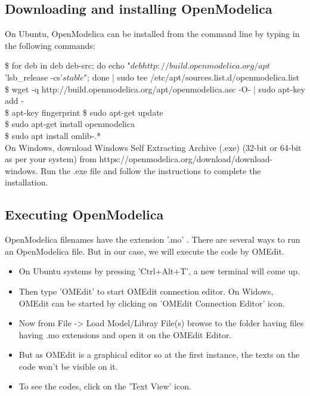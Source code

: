 \subsection{Downloading and installing OpenModelica}\label{OpenModelica-installation}

On Ubuntu, OpenModelica can be installed from the command line by typing in the 
following commands:

\$ for deb in deb deb-src; do echo "$deb http://build.openmodelica.org/apt $'lsb\_release -cs'$ stable$"; done | sudo tee /etc/apt/sources.list.d/openmodelica.list \\
\$ wget -q http://build.openmodelica.org/apt/openmodelica.asc -O- | sudo apt-key add -  \\
\$ apt-key fingerprint
\$ sudo apt-get update \\
\$ sudo apt-get install openmodelica \\
\$ sudo apt install omlib-.* \\
On Windows,
download Windows Self Extracting Archive (.exe)  (32-bit or 64-bit as per your system) from https://openmodelica.org/download/download-windows. Run the .exe file and follow the instructions to complete the
installation.


\subsection{Executing OpenModelica}\label{OpenModelica-code-execution}
OpenModelica filenames have the extension '.mo' . There are several ways to run an OpenModelica file.
But in our case, we will execute the code by OMEdit.

\begin{itemize}
      \item On Ubuntu systems by pressing 'Ctrl$+$Alt$+$T', a new terminal will come up.
      \item Then type 'OMEdit' to start OMEdit connection editor. On Widows, OMEdit can be started by clicking on 'OMEdit Connection Editor' icon.
      \item Now from File -> Load Model/Libray File(s) browse to the folder having files having .mo extensions and open it on the OMEdit Editor.
      \item But as OMEdit is a graphical editor so at the first instance, the texts on the code won't be visible on it.
      \item To see the codes, click on the 'Text View' icon.
\end{itemize}



